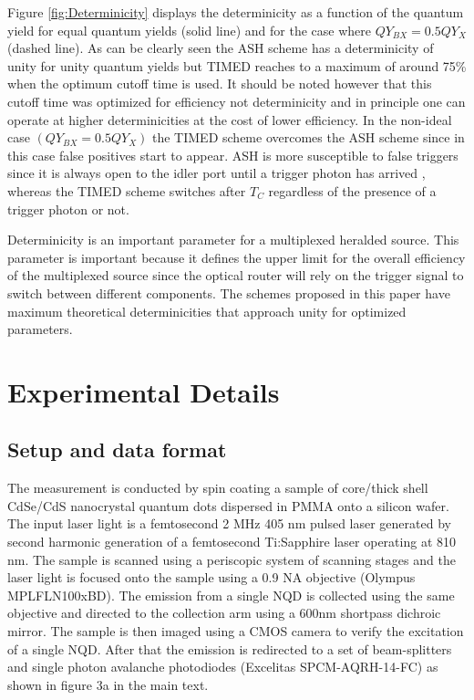 \documentclass[reprint,onecolumn]{revtex4-1}
\begin{document}
Figure \ref{fig:Determinicity} displays the determinicity as a function
of the quantum yield for equal quantum yields (solid line) and for
the case where $QY_{BX}=0.5QY_{X}$ (dashed line). As can be clearly
seen the ASH scheme has a determinicity of unity for unity quantum
yields but TIMED reaches to a maximum of around 75\% when the optimum
cutoff time is used. It should be noted however that this cutoff time
was optimized for efficiency not determinicity and in principle one
can operate at higher determinicities at the cost of lower efficiency.
In the non-ideal case $\left(QY_{BX}=0.5QY_{X}\right)$ the TIMED
scheme overcomes the ASH scheme since in this case false positives
start to appear. ASH is more susceptible to false triggers since it
is always open to the idler port until a trigger photon has arrived
, whereas the TIMED scheme switches after $T_{C}$ regardless of the
presence of a trigger photon or not.

Determinicity is an important parameter for a multiplexed heralded source.
This parameter is important because it defines the upper limit for the overall efficiency of the multiplexed source since the optical router will rely on the trigger signal to switch between different components.
The schemes proposed in this paper have maximum theoretical determinicities that approach unity for optimized parameters. 


\section{Experimental Details}

\subsection{Setup and data format }

The measurement is conducted by spin coating a sample of core/thick
shell CdSe/CdS nanocrystal quantum dots dispersed in PMMA onto a silicon
wafer. The input laser light is a femtosecond 2 MHz 405 nm pulsed
laser generated by second harmonic generation of a femtosecond Ti:Sapphire
laser operating at 810 nm. The sample is scanned using a periscopic
system of scanning stages and the laser light is focused onto the
sample using a 0.9 NA objective (Olympus MPLFLN100xBD). The emission from a single NQD
is collected using the same objective and directed to the collection
arm using a 600nm shortpass dichroic mirror. The sample is then imaged
using a CMOS camera to verify the excitation of a single NQD. After that the emission is redirected to a set of beam-splitters and single
photon avalanche photodiodes (Excelitas SPCM-AQRH-14-FC) as shown in figure 3a in the
main text. 
\end{document}
